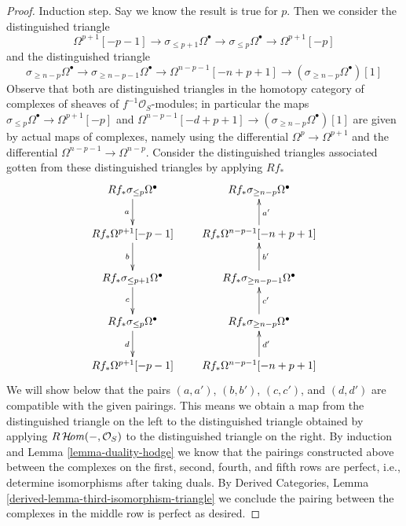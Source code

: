 \begin{proof}
\medskip\noindent
Induction step. Say we know the result is true for $p$. Then
we consider the distinguished triangle
$$
\Omega^{p + 1}[-p - 1] \to
\sigma_{\leq p + 1}\Omega^\bullet \to
\sigma_{\leq p}\Omega^\bullet \to
\Omega^{p + 1}[-p]
$$
and the distinguished triangle
$$
\sigma_{\geq n - p}\Omega^\bullet \to
\sigma_{\geq n - p - 1}\Omega^\bullet \to
\Omega^{n - p - 1}[-n + p + 1] \to
(\sigma_{\geq n - p}\Omega^\bullet)[1]
$$
Observe that both are distinguished triangles in the homotopy category
of complexes of sheaves of $f^{-1}\mathcal{O}_S$-modules; in particular the
maps $\sigma_{\leq p}\Omega^\bullet \to \Omega^{p + 1}[-p]$ and
$\Omega^{n - p - 1}[-d + p + 1] \to (\sigma_{\geq n - p}\Omega^\bullet)[1]$
are given by actual maps of complexes, namely using the differential
$\Omega^p \to \Omega^{p + 1}$ and the differential
$\Omega^{n - p - 1} \to \Omega^{n - p}$.
Consider the distinguished triangles associated gotten from these
distinguished triangles by applying $Rf_*$
$$
\xymatrix{
Rf_*\sigma_{\leq p}\Omega^\bullet \ar[d]_a \\
Rf_*\Omega^{p + 1}[-p - 1] \ar[d]_b \\
Rf_*\sigma_{\leq p + 1}\Omega^\bullet \ar[d]_c \\
Rf_*\sigma_{\leq p}\Omega^\bullet \ar[d]_d \\
Rf_*\Omega^{p + 1}[-p - 1]
}
\quad\quad
\xymatrix{
Rf_*\sigma_{\geq n - p}\Omega^\bullet \\
Rf_*\Omega^{n - p - 1}[-n + p + 1] \ar[u]_{a'} \\
Rf_*\sigma_{\geq n - p - 1}\Omega^\bullet \ar[u]_{b'} \\
Rf_*\sigma_{\geq n - p}\Omega^\bullet \ar[u]_{c'} \\
Rf_*\Omega^{n - p - 1}[-n + p + 1] \ar[u]_{d'}
}
$$
We will show below that the pairs $(a, a')$, $(b, b')$, $(c, c')$, and
$(d, d')$ are compatible with the given pairings. This means we obtain a
map from the distinguished triangle on the left to the distinguished triangle
obtained by applying $R\mathop{\mathcal{H}\!\mathit{om}}\nolimits(-, \mathcal{O}_S)$ to the distinguished
triangle on the right. By induction and Lemma \ref{lemma-duality-hodge}
we know that the pairings constructed above between the
complexes on the first, second, fourth, and fifth
rows are perfect, i.e., determine isomorphisms after taking duals.
By Derived Categories, Lemma \ref{derived-lemma-third-isomorphism-triangle}
we conclude the pairing between the complexes in the middle row
is perfect as desired.


\end{proof}
